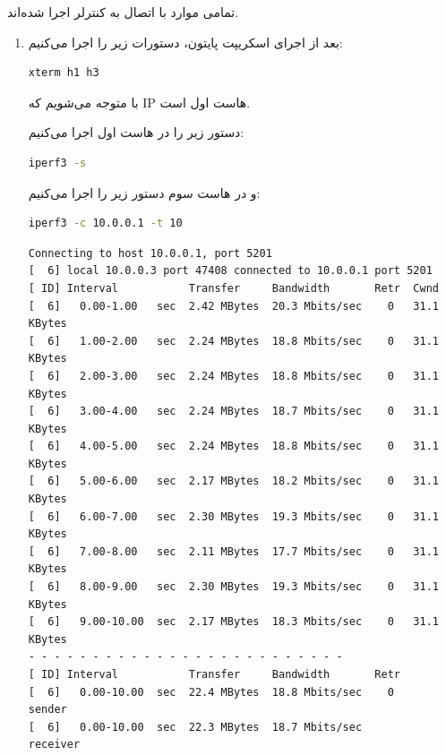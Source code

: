 \documentclass[12pt]{article}
\begin{document}
تمامی موارد با اتصال به کنترلر  اجرا شده‌اند.

\begin{enumerate}
	\item 
	بعد از اجرای اسکریپت پایتون، دستورات زیر را اجرا می‌کنیم:
	
	\begin{latin}
	\begin{lstlisting}[language=bash]
		xterm h1 h3
	\end{lstlisting}
\end{latin}

با  متوجه‌ می‌شویم که IP هاست اول  است.

دستور زیر را در هاست اول اجرا می‌کنیم:
	
\begin{latin}
	\begin{lstlisting}[language=bash]
		iperf3 -s
	\end{lstlisting}
\end{latin}

و در هاست سوم دستور زیر را اجرا می‌کنیم:
\begin{latin}
	\begin{lstlisting}[language=bash]
		iperf3 -c 10.0.0.1 -t 10
	\end{lstlisting}
\end{latin}

\begin{latin}
	\begin{Verbatim}
Connecting to host 10.0.0.1, port 5201
[  6] local 10.0.0.3 port 47408 connected to 10.0.0.1 port 5201
[ ID] Interval           Transfer     Bandwidth       Retr  Cwnd
[  6]   0.00-1.00   sec  2.42 MBytes  20.3 Mbits/sec    0   31.1 KBytes       
[  6]   1.00-2.00   sec  2.24 MBytes  18.8 Mbits/sec    0   31.1 KBytes       
[  6]   2.00-3.00   sec  2.24 MBytes  18.8 Mbits/sec    0   31.1 KBytes       
[  6]   3.00-4.00   sec  2.24 MBytes  18.7 Mbits/sec    0   31.1 KBytes       
[  6]   4.00-5.00   sec  2.24 MBytes  18.8 Mbits/sec    0   31.1 KBytes       
[  6]   5.00-6.00   sec  2.17 MBytes  18.2 Mbits/sec    0   31.1 KBytes       
[  6]   6.00-7.00   sec  2.30 MBytes  19.3 Mbits/sec    0   31.1 KBytes       
[  6]   7.00-8.00   sec  2.11 MBytes  17.7 Mbits/sec    0   31.1 KBytes       
[  6]   8.00-9.00   sec  2.30 MBytes  19.3 Mbits/sec    0   31.1 KBytes       
[  6]   9.00-10.00  sec  2.17 MBytes  18.3 Mbits/sec    0   31.1 KBytes       
- - - - - - - - - - - - - - - - - - - - - - - - -
[ ID] Interval           Transfer     Bandwidth       Retr
[  6]   0.00-10.00  sec  22.4 MBytes  18.8 Mbits/sec    0             sender
[  6]   0.00-10.00  sec  22.3 MBytes  18.7 Mbits/sec                  receiver
	

\end{Verbatim}
\end{latin}
\end{enumerate}
\end{document}
